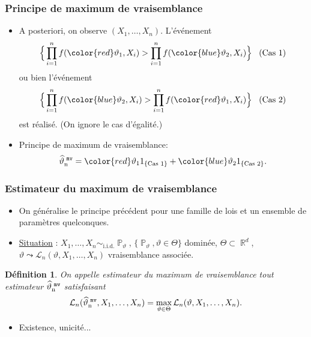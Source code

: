 ﻿\documentclass{beamer}
\newtheorem{df}{Définition}
\DeclareMathOperator{\R}{{\mathbb R}}
\DeclareMathOperator{\PP}{{\mathbb P}}
\DeclareMathOperator{\estMV}{\widehat \vartheta_n^{\,\,{\tt mv}}}
\begin{document}
\begin{frame}
\frametitle{Principe de maximum de vraisemblance}
\begin{itemize}
\item {\color{red}A posteriori, on observe $(X_1,\ldots, X_n)$.} L'événement
$$\Big\{\prod_{i = 1}^n f({\color{red}\vartheta_1},X_i) > \prod_{i = 1}^n f({\color{blue}\vartheta_2},X_i)\Big\}\;\;\;\text{(Cas 1)}$$
{\color{red}ou bien} l'événement
$$\Big\{\prod_{i = 1}^n f({\color{blue}\vartheta_2},X_i) > \prod_{i = 1}^n f({\color{red}\vartheta_1},X_i)\Big\}\;\;\;\text{(Cas 2)}$$
est réalisé. (On ignore le cas d'égalité.)
\item {\color{red} Principe de maximum de vraisemblance:}
$$\estMV = {\color{red}\vartheta_1} 1_{\{\text{Cas 1}\}}+ {\color{blue}\vartheta_2} 1_{\{\text{Cas 2}\}}.$$
\end{itemize}
\end{frame}

\begin{frame}
\frametitle{Estimateur du maximum de vraisemblance}
\begin{itemize}
\item On généralise le principe précédent pour une famille de lois et un ensemble de paramètres {\color{red}quelconques}.
\item \underline{Situation} : $X_1,\ldots, X_n\sim_{\text{i.i.d.}}\PP_\vartheta$, $\{\PP_\vartheta,\vartheta \in \Theta\}$ dominée, $\Theta \subset \R^d$, $\vartheta \leadsto {\mathcal L}_n(\vartheta, X_1,\ldots, X_n)$ vraisemblance associée.
\end{itemize}
\begin{df}
On appelle {\color{red} estimateur du maximum de vraisemblance} tout estimateur $\estMV$ satisfaisant
$${\mathcal L}_n(\estMV,X_1,\ldots, X_n) = \max_{\vartheta \in \Theta} {\mathcal L}_n(\vartheta, X_1,\ldots, X_n).$$
\end{df}
\begin{itemize}
\item {\color{red}Existence, unicité...}
\end{itemize}
\end{frame}
\end{document}
